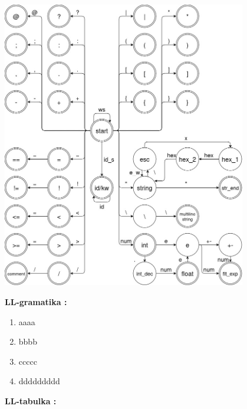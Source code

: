 \documentclass[12pt]{article}
\begin{document}
\includegraphics[width=0.8\textwidth,scale=0.5]{fsm}

\newpage

 \Large \textbf{LL-gramatika :} \\ \normalsize
\noindent\makebox[\linewidth]{\rule{\textwidth}{0.4pt}}
\begin{enumerate}
\item aaaa
\item bbbb
\item ccccc
\item ddddddddd
\end{enumerate}


 \Large \textbf{LL-tabulka :}
\newline \\
\end{document}
